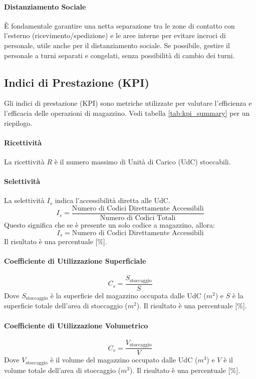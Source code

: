 \paragraph{Distanziamento Sociale} È fondamentale garantire una netta separazione tra le zone di contatto con l'esterno (ricevimento/spedizione) e le aree interne per evitare incroci di personale, utile anche per il distanziamento sociale. Se possibile, gestire il personale a turni separati e congelati, senza possibilità di cambio dei turni.

%
\subsection{Indici di Prestazione (KPI)}
Gli indici di prestazione (KPI) sono metriche utilizzate per valutare l'efficienza e l'efficacia delle operazioni di magazzino. Vedi tabella \ref{tab:kpi_summary} per un riepilogo.
%
\paragraph{Ricettività} La ricettività $ R $ è il numero massimo di Unità di Carico (UdC) stoccabili.
%
\paragraph{Selettività} La selettività $ I_{s} $ indica l'accessibilità diretta alle UdC.
\[
    I_{s} = \frac{\text{Numero di Codici Direttamente Accessibili}}{\text{Numero di Codici Totali}}
\]
Questo significa che se è presente un solo codice a magazzino, allora:
\[
    I_{s} = \text{Numero di Codici Direttamente Accessibili}
\]
Il risultato è una percentuale [$ \% $].

%
\paragraph{Coefficiente di Utilizzazione Superficiale}
\[
    C_{s} = \frac{S_{\text{stoccaggio}}}{S}
\]
Dove $ S_{\text{stoccaggio}} $ è la superficie del magazzino occupata dalle UdC ($ \si{m^2} $) e $ S $ è la superficie totale dell'area di stoccaggio ($ \si{m^2} $). Il risultato è una percentuale [$ \% $].

%
\paragraph{Coefficiente di Utilizzazione Volumetrico}
\[
    C_{v} = \frac{V_{\text{stoccaggio}}}{V}
\]
Dove $ V_{\text{stoccaggio}} $ è il volume del magazzino occupato dalle UdC ($ \si{m^3} $) e $ V $ è il volume totale dell'area di stoccaggio ($ \si{m^3} $). Il risultato è una percentuale [$ \% $].
%
